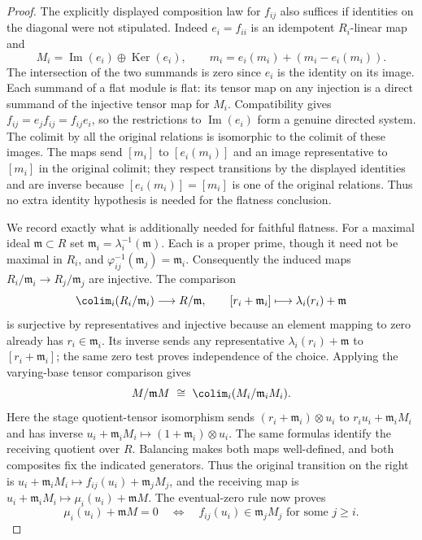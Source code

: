 \begin{proof}
The explicitly displayed composition law for $f_{ij}$ also
suffices if identities on the diagonal were not stipulated.
Indeed $e_i=f_{ii}$ is an idempotent $R_i$-linear map and
$$
M_i=\operatorname{Im}(e_i)\oplus\operatorname{Ker}(e_i),
\qquad m_i=e_i(m_i)+(m_i-e_i(m_i)).
$$
The intersection of the two summands is zero since $e_i$
is the identity on its image. Each summand of a flat module
is flat: its tensor map on any injection is a direct summand
of the injective tensor map for $M_i$. Compatibility gives
$f_{ij}=e_jf_{ij}=f_{ij}e_i$, so the restrictions to
$\operatorname{Im}(e_i)$ form a genuine directed system.
The colimit by all the original relations is isomorphic to
the colimit of these images. The maps send $[m_i]$ to
$[e_i(m_i)]$ and an image representative to $[m_i]$ in the
original colimit; they respect transitions by the displayed
identities and are inverse because $[e_i(m_i)]=[m_i]$ is
one of the original relations. Thus no extra identity
hypothesis is needed for the flatness conclusion.

\medskip\noindent
We record exactly what is additionally needed for faithful
flatness. For a maximal ideal $\mathfrak m\subset R$ set
$\mathfrak m_i=\lambda_i^{-1}(\mathfrak m)$. Each is a
proper prime, though it need not be maximal in $R_i$, and
$\varphi_{ij}^{-1}(\mathfrak m_j)=\mathfrak m_i$.
Consequently the induced maps $R_i/\mathfrak m_i\to R_j/\mathfrak m_j$
are injective. The comparison
$$
\colim_i(R_i/\mathfrak m_i)\longrightarrow R/\mathfrak m,
\qquad [r_i+\mathfrak m_i]\longmapsto\lambda_i(r_i)+\mathfrak m
$$
is surjective by representatives and injective because an
element mapping to zero already has $r_i\in\mathfrak m_i$.
Its inverse sends any representative $\lambda_i(r_i)+\mathfrak m$
to $[r_i+\mathfrak m_i]$; the same zero test proves independence
of the choice. Applying the varying-base tensor comparison
gives
$$
M/\mathfrak mM\ \cong\
\colim_i(M_i/\mathfrak m_iM_i).
$$
Here the stage quotient-tensor isomorphism sends
$(r_i+\mathfrak m_i)\otimes u_i$ to
$r_iu_i+\mathfrak m_iM_i$ and has inverse
$u_i+\mathfrak m_iM_i\mapsto(1+\mathfrak m_i)\otimes u_i$.
The same formulas identify the receiving quotient over $R$.
Balancing makes both maps well-defined, and both composites
fix the indicated generators. Thus the original transition
on the right is
$u_i+\mathfrak m_iM_i\mapsto f_{ij}(u_i)+\mathfrak m_jM_j$,
and the receiving map is
$u_i+\mathfrak m_iM_i\mapsto\mu_i(u_i)+\mathfrak mM$.
The eventual-zero rule now proves
$$
\mu_i(u_i)+\mathfrak mM=0
\quad\Longleftrightarrow\quad
f_{ij}(u_i)\in\mathfrak m_jM_j\text{ for some }j\geq i.
$$


\end{proof}
